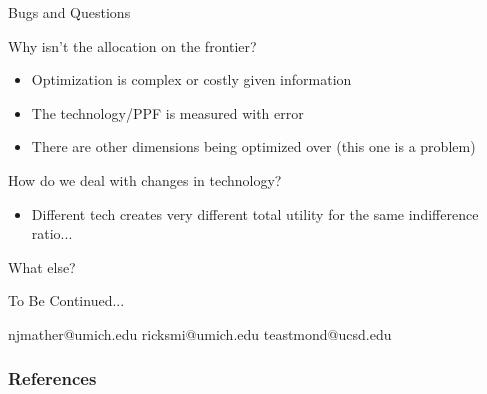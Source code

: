 \documentclass[t,aspectratio=169,11pt,presentation]{beamer}
\newenvironment{wideitemize}{\itemize\addtolength{\itemsep}{14pt}}{\enditemize}
\begin{document}
\begin{frame}{Bugs and Questions}

\begin{wideitemize}
     \item Why isn't the allocation on the frontier?
     \begin{itemize}
         \item Optimization is complex or costly given information
         \item The technology/PPF is measured with error
         \item There are other dimensions being optimized over  (this one is a problem)
     \end{itemize}
   \item How do we deal with changes in technology?
        \begin{itemize}
         \item Different tech creates very different total utility for the same indifference ratio...
     \end{itemize}
   
   \item What else?
\end{wideitemize}
\end{frame}




\begin{frame}[c,noframenumbering]
\centering
\Huge{\centerline{To Be Continued...}}
\normalsize njmather{\selectfont @}umich.edu \hspace{2em}
ricksmi{\selectfont @}umich.edu \hspace{2em} \normalsize teastmond{\selectfont @}ucsd.edu
\end{frame}



\begin{frame}[noframenumbering]
\frametitle{References}
\tiny

\end{frame}



\appendix


\end{document}
